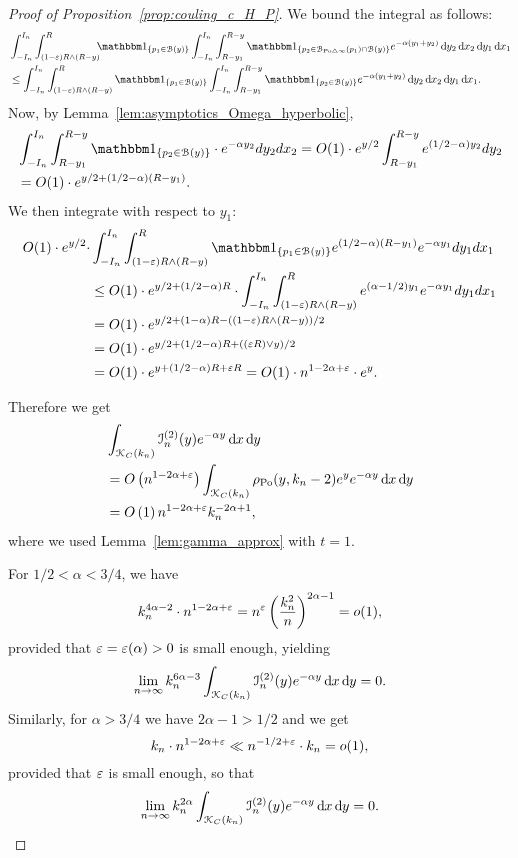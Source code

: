 \begin{proof}[Proof of Proposition~\ref{prop:couling_c_H_P}]
We bound the integral as follows: 
\begin{align*}
	&\int_{-I_n}^{I_n} \int_{(1-\eps) R \wedge (R-y)}^{R} \hspace{-5pt} \ind{p_1 \in \BallHyp{y}}
		\int_{-I_n}^{I_n} \int_{R - y_1}^{R - y} \ind{p_2 \in \BallSym{p_1} \cap \BallHyp{y}}
		e^{-\alpha(y_1 + y_2)} \dd y_2 \dd x_2 \dd y_1 \dd x_1 \\
	&\leq \int_{-I_n}^{I_n} \int_{(1-\eps) R \wedge (R-y)}^{R} \ind{p_1 \in \BallHyp{y}}
		\int_{-I_n}^{I_n} \int_{R - y_1}^{R - y} 
		\ind{p_2 \in  \BallHyp{y}} e^{-\alpha(y_1 + y_2)} \dd y_2 \dd x_2 \dd y_1 \dd x_1.
\end{align*}
Now, by Lemma~\ref{lem:asymptotics_Omega_hyperbolic},
\begin{align*}
&\int_{-I_n}^{I_n} \int_{R - y_1}^{R - y} \ind{p_2 \in  \BallHyp{y}} \cdot  
e^{-\alpha y_2} dy_2 dx_2 = O(1) \cdot e^{y/2} \int_{R - y_1}^{R - y} e^{(1/2 - \alpha) y_2} dy_2 \\
&= O(1) \cdot e^{y/2 + (1/2 - \alpha) (R - y_1)}.
\end{align*}
We then integrate with respect to $y_1$:
\begin{align*}
	O(1) \cdot e^{y/2} \cdot 
	&\int_{-I_n}^{I_n} \int_{(1-\eps) R \wedge (R-y)}^{R} \ind{p_1 \in \BallHyp{y}} 
		e^{(1/2 - \alpha) (R - y_1)} e^{-\alpha y_1} dy_1 dx_1 \\
	&\le O(1) \cdot e^{y/2 + (1/2 -\alpha) R} \cdot \int_{-I_n}^{I_n} \int_{(1-\eps) R \wedge (R-y)}^{R} 
		e^{(\alpha -1/2) y_1} e^{-\alpha y_1} dy_1dx_1 \\
	&=O(1) \cdot e^{y/2 + (1 -\alpha) R -((1-\eps) R \wedge (R-y))/2} \\
	&=O(1) \cdot e^{y/2 + (1/2 -\alpha) R + ((\eps R) \vee y)/2}\\
	&=O(1) \cdot e^{y + (1/2 -\alpha) R + \eps R}
		= O(1) \cdot n^{1- 2\alpha+ \eps} \cdot e^{y}. 
\end{align*}

Therefore we get
\begin{align*} 
	&\int_{{\mathcal K}_{C}(k_n)}\mathcal{I}_n^{(2)}(y) e^{-\alpha y} \operatorname{\mathrm{d}\hspace{-2pt}} x \operatorname{\mathrm{d}\hspace{-2pt}} y\\
	&= O\left( n^{1-2\alpha + \varepsilon} \right)
		\int_{{\mathcal K}_{C}(k_n)} \rho_{{\mathrm{Po}}}(y,k_n-2) e^{y} e^{-\alpha y} \operatorname{\mathrm{d}\hspace{-2pt}} x \operatorname{\mathrm{d}\hspace{-2pt}} y\\
	&= O\left(1\right) n^{1-2\alpha + \varepsilon} k_n^{-2\alpha + 1},
\end{align*}
where we used Lemma~\ref{lem:gamma_approx} with $t = 1$.

For $1/2 < \alpha < 3/4$, we have
\[
	k_n^{4 \alpha -2} \cdot  n^{1-2\alpha + \varepsilon} = n^{\varepsilon} \left( \frac{k_n^2}{n}\right)^{2\alpha -1} = o(1),
\]
provided that $\varepsilon = \varepsilon (\alpha)>0$ is small enough, yielding
\[
	\lim_{n \to \infty} k_n^{6\alpha - 3} 
			\int_{{\mathcal K}_{C}(k_n)}\mathcal{I}_n^{(2)}(y) e^{-\alpha y} \operatorname{\mathrm{d}\hspace{-2pt}} x \operatorname{\mathrm{d}\hspace{-2pt}} y = 0.
\]
Similarly, for $\alpha > 3/4$ we have $2\alpha -1 > 1/2$ and we get
\[
	k_n \cdot n^{1-2\alpha + \varepsilon} \ll n^{-1/2 + \varepsilon}  \cdot k_n  = o(1),
\]
provided that $\varepsilon$ is small enough, so that
\[
	\lim_{n \to \infty} k_n^{2\alpha}
			\int_{{\mathcal K}_{C}(k_n)} \mathcal{I}_n^{(2)}(y) e^{-\alpha y} \operatorname{\mathrm{d}\hspace{-2pt}} x \operatorname{\mathrm{d}\hspace{-2pt}} y = 0.
\]


\end{proof}
